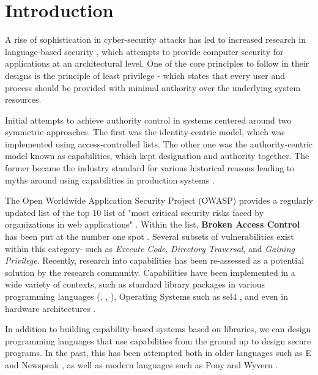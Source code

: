 
\section{Introduction}\label{sec-intro}
\noindent
A rise of sophistication in cyber-security attacks has led to increased research in language-based security \cite{10.1007/11555827_12}, which attempts to provide computer security for applications at an architectural level. One of the core principles to follow in their designs is the principle of least privilege - which states that every user and process should be provided with minimal authority over the underlying system resources. 

Initial attempts to achieve authority control in systems centered around two symmetric approaches. \cite{millerKeynote} The first was the identity-centric model, which was implemented using access-controlled lists. The other one was the authority-centric model known as capabilities, which kept designation and authority together. The former became the industry standard for various historical reasons leading to myths around using capabilities in production systems \cite{markCapsMyth}. 

The Open Worldwide Application Security Project (OWASP) provides a regularly updated list of the top 10 list of "most critical security risks faced by organizations in web applications" \cite{owaspTop10}. Within the list, \textbf{Broken Access Control} has been put at the number one spot \cite{owaspBrokenAccess}. Several subsets of vulnerabilities exist within this category- such as \textit{Execute Code}, \textit{Directory Traversal}, and \textit{Gaining Privilege}. Recently, research into capabilities has been re-assessed as a potential solution by the research community. Capabilities have been implemented in a wide variety of contexts, such as standard library packages in various programming languages (\cite{rustCap}, \cite{scalaCaps}, \cite{goCap}), Operating Systems such as sel4 \cite{sel4}, and even in hardware architectures \cite{watson2018capability}. 

In addition to building capability-based systems based on libraries, we can design programming languages that use capabilities from the ground up to design secure programs. In the past, this has been attempted both in older languages such as E \cite{eProgLang} and Newspeak \cite{newspeakProgLang}, as well as modern languages such as Pony \cite{steed2016principled} and Wyvern \cite{DBLP:wyvern}.


